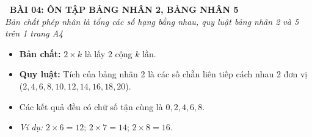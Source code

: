 \documentclass[12pt,a4paper]{article}
\begin{document}
\begin{tcolorbox}[
  enhanced,
  colback=teal!8!white,
  colframe=teal!70!black,
  arc=3mm, boxrule=1.2pt,
  left=3mm, right=3mm, top=2mm, bottom=2mm,
  halign=center
]
  {\LARGE\bfseries\color{teal!90!black}\faBookmark\ BÀI 04: ÔN TẬP BẢNG NHÂN 2, BẢNG NHÂN 5}\\[1mm]
  {\itshape\footnotesize\color{black!75} Bản chất phép nhân là tổng các số hạng bằng nhau, quy luật bảng nhân 2 và 5 trên 1 trang A4}
\end{tcolorbox}

\vspace{-2mm}

\noindent
\begin{minipage}[t]{0.49\textwidth}\vspace{0pt}
\begin{tcolorbox}[
  enhanced,
  colback=blue!4!white,
  colframe=blue!75!black,
  arc=2mm, boxrule=0.8pt,
  left=2mm, right=2mm, top=1.8mm, bottom=1.8mm,
  title={\footnotesize\bfseries\color{white}\faTimes\ 1. Bảng nhân 2 (Quy luật đếm thêm 2)}
]
{\footnotesize
\begin{itemize}\setlength{\itemsep}{0.8pt}\setlength{\leftskip}{-2.5mm}
  \item \textbf{Bản chất:} $2 \times k$ là lấy $2$ cộng $k$ lần.
  \item \textbf{Quy luật:} Tích của bảng nhân 2 là các số chẵn liên tiếp cách nhau 2 đơn vị ($2, 4, 6, 8, 10, 12, 14, 16, 18, 20$).
  \item Các kết quả đều có chữ số tận cùng là $0, 2, 4, 6, 8$.
  \item \textit{Ví dụ:} $2 \times 6 = 12$; $2 \times 7 = 14$; $2 \times 8 = 16$.
\end{itemize}
}
\end{tcolorbox}
\end{minipage}
\hfill
\end{document}
